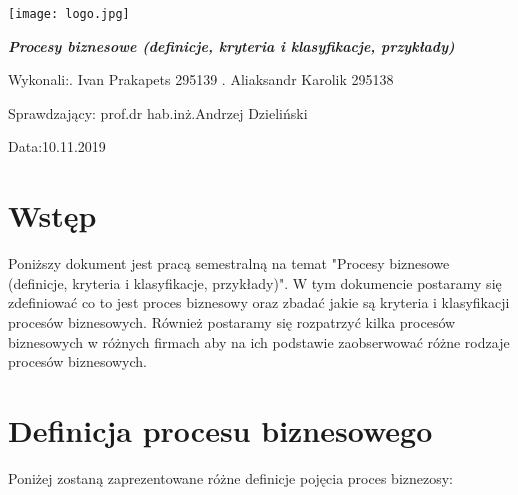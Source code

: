 \documentclass[a4paper, 12pt]{article}
\newcommand{\mainmatter}{\clearpage \cfoot{\thepage\ of \pageref{LastPage}}
\pagenumbering{arabic}}
\begin{document}
	\begin{titlepage}
\texttt{[image: logo.jpg]}
		\begin{center}
    			\vspace{3cm}
    					\Large\textit{\textbf{Procesy biznesowe (definicje, kryteria i klasyfikacje, przykłady)}}
   			\vspace{4cm}
		\end{center} 

		\hfill\begin{minipage}{0.54\textwidth}
			\Large Wykonali:. Ivan Prakapets 295139 . Aliaksandr Karolik 295138
		\vspace{\baselineskip}
		\end{minipage}
		
		\hfill\begin{minipage}{0.54\textwidth}
			\Large Sprawdzający:\newline
		 		prof.dr hab.inż.Andrzej Dzieliński
\vspace{\baselineskip}
		\end{minipage}

		\hfill\begin{minipage}{0.54\textwidth}
			\Large Data:10.11.2019
			\vspace{\baselineskip}
		\end{minipage}
	\end{titlepage}
\newpage
\mainmatter
\setlength{\headheight}{15pt}
\doublespacing
\tableofcontents
\newpage

\linespread{0.5}

\section{Wstęp}
\hspace*{1.5 cm}Poniższy dokument jest  pracą semestralną na temat "Procesy biznesowe (definicje, kryteria i klasyfikacje, przykłady)". W tym dokumencie postaramy się zdefiniować co to jest proces biznesowy oraz zbadać jakie są kryteria i klasyfikacji procesów biznesowych. Również postaramy się rozpatrzyć kilka procesów biznesowych w różnych firmach aby na ich podstawie zaobserwować różne rodzaje procesów biznesowych. 
\section{Definicja procesu biznesowego}
\hspace*{1.5 cm}Poniżej zostaną zaprezentowane różne definicje pojęcia proces biznezosy:
\end{document}
